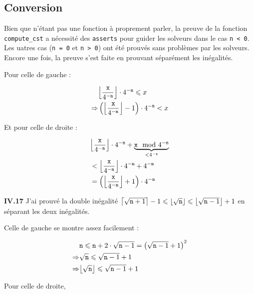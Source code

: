 \documentclass[9pt,a4paper,twocolumn]{article}
\theoremstyle{definition}
\DeclarePairedDelimiter\ceil{\lceil}{\rceil}
\DeclarePairedDelimiter\floor{\lfloor}{\rfloor}
\renewcommand{\leq}{\leqslant}
\begin{document}
\subsection{Conversion}

Bien que n'étant pas une fonction à proprement parler, la preuve de la fonction
\texttt{compute\_cst} a nécessité des \texttt{asserts} pour guider les solveurs
dans le cas \texttt{n < 0}. Les uatres cas (\texttt{n = 0} et \texttt{n > 0})
ont été prouvés sans problèmes par les solveurs.
Encore une fois, la preuve s'est faite en prouvant séparément les inégalités.

Pour celle de gauche :

\begin{align*}
   &\floor*{\frac{\texttt{x}}{4^{-\texttt{n}}}}\cdot 4^{-\texttt{n}}
      \leq x\\
\Rightarrow
   &\left(\floor*{\frac{\texttt{x}}{4^{-\texttt{n}}}}-1\right)\cdot 4^{-\texttt{n}}
      < x\\
\end{align*}

Et pour celle de droite :

\begin{align*}
   &\floor*{\frac{\texttt{x}}{4^{-\texttt{n}}}}\cdot 4^{-\texttt{n}}
      + \underbrace{\texttt{x} \mod 4^{-\texttt{n}}}_{<4^{-\texttt{n}}} \\
   &< \floor*{\frac{\texttt{x}}{4^{-\texttt{n}}}}\cdot 4^{-\texttt{n}}
      + 4^{-\texttt{n}} \\
   & = \left(\floor*{\frac{\texttt{x}}{4^{-\texttt{n}}}}+1\right)\cdot 4^{-\texttt{n}}
\end{align*}

\textbf{IV.17}
J'ai prouvé la double inégalité
$
\ceil*{\sqrt{\texttt{n}+1}} -1
\leq \floor*{\sqrt{\texttt{n}}}
\leq \floor*{\sqrt{\texttt{n}-1}}+1
$
en séparant les deux inégalités.

Celle de gauche se montre assez facilement :

\begin{align*}
   &\texttt{n} \leq \texttt{n} +2\cdot\sqrt{\texttt{n}-1}
      =\left(\sqrt{\texttt{n}-1}+1\right)^2\\
\Rightarrow
    &\sqrt{ \texttt{n} } \leq \sqrt{\texttt{n}-1}+1 \\
 \Rightarrow
        &\floor*{\sqrt{ \texttt{n} }} \leq \sqrt{\texttt{n}-1}+1 \\
\end{align*}

Pour celle de droite,
\end{document}
